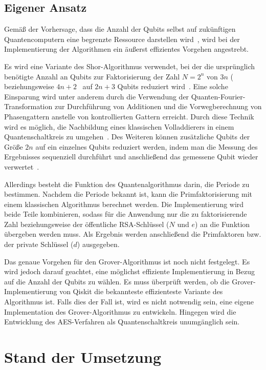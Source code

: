 \documentclass[
  a4paper, %
  10pt, %
  unnumberedsections, %
  twoside, %
]{LTJournalArticle}
\begin{document}
\subsection{Eigener Ansatz}

Gemäß der Vorhersage, dass die Anzahl der Qubits
selbst auf zukünftigen Quantencomputern eine begrenzte Ressource darstellen wird~\autocite{zalka1998fast},
wird bei der Implementierung der Algorithmen ein äußerst effizientes Vorgehen angestrebt.

Es wird eine Variante des Shor-Algorithmus verwendet,
bei der die ursprünglich benötigte Anzahl an Qubits zur Faktorisierung der Zahl
\(N = 2^{n}\) von \(3n\) (~\autocite{zalka1998fast} beziehungsweise
\(4n+2\)~\autocite{IBM:Shor_docu} auf \(2n+3\) Qubits reduziert wird~\autocite{beauregard2003circuit}.
Eine solche Einsparung wird unter anderem durch
die Verwendung der Quanten-Fourier-Transformation zur Durchführung von Additionen und
die Vorwegberechnung von Phasengattern anstelle von kontrollierten Gattern erreicht.
Durch diese Technik wird es möglich,
die Nachbildung eines klassischen Volladdierers in einem Quantenschaltkreis zu umgehen~\autocite{draper2000addition}.
Des Weiteren können zusätzliche Qubits der Größe \(2n\) auf ein einzelnes Qubits reduziert werden,
indem man die Messung des Ergebnisses sequenziell durchführt und anschließend das gemessene Qubit wieder verwertet~\autocite{Parker_2000}.

Allerdings besteht die Funktion des Quantenalgorithmus darin,
die Periode zu bestimmen.
Nachdem die Periode bekannt ist,
kann die Primfaktorisierung mit einem klassischen Algorithmus berechnet werden.
Die Implementierung wird beide Teile kombinieren,
sodass für die Anwendung nur die zu faktorisierende Zahl beziehungsweise
der öffentliche RSA-Schlüssel (\(N\) und \(e\)) an die Funktion übergeben werden muss.
Als Ergebnis werden anschließend die Primfaktoren bzw. der private Schlüssel (\(d\)) ausgegeben.

Das genaue Vorgehen für den Grover-Algorithmus ist noch nicht festgelegt.
Es wird jedoch darauf geachtet, eine möglichst effiziente Implementierung in Bezug auf die Anzahl der Qubits zu wählen.
Es muss überprüft werden, ob die Grover-Implementierung von Qiskit die bekannteste effizienteste Variante des Algorithmus ist.
Falls dies der Fall ist, wird es nicht notwendig sein,
eine eigene Implementation des Grover-Algorithmus zu entwickeln.
Hingegen wird die Entwicklung des AES-Verfahren als Quantenschaltkreis unumgänglich sein.

\section{Stand der Umsetzung}
\end{document}
